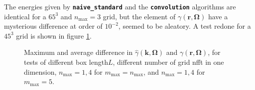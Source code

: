 The energies given by \texttt{\textbf{naive\_standard}} and the \texttt{\textbf{convolution}}
algorithms are identical for a $65^{3}$ and $n_{\max}=3$ grid, but
the element of $\gamma(\mathbf{r},\mathbf{\Omega})$ have a mysterious
difference at order of $10^{-2}$, seemed to be aleatory. A test redone
for a $45^{3}$ grid is shown in figure \ref{fig:Difference-in-gamma}.

\begin{figure}[H]
\begin{centering}
\par\end{centering}
\begin{centering}
\par\end{centering}
\caption[Maximum and average difference in $\hat{\gamma}(\mathbf{k},\mathbf{\Omega})$
and $\gamma(\mathbf{r},\mathbf{\Omega})$]{Maximum and average difference in $\hat{\gamma}(\mathbf{k},\mathbf{\Omega})$
and $\gamma(\mathbf{r},\mathbf{\Omega})$, for tests of different
box length$L$, different number of grid nfft in one dimension, $n_{\max}=1,4$
for $m_{\max}=n_{\max}$, and $n_{\max}=1,4$ for $m_{\max}=5$.\label{fig:Difference-in-gamma}}
\end{figure}

